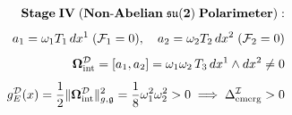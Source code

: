 \documentclass[preview]{standalone}
\begin{document}
\begin{align*}
\special{dvisvgm:raw <g id='unique000'>}\mathbf{Stage\;IV\;(Non\text{-}Abelian\;\mathfrak{su}(2)\;Polarimeter):}\\[4pt]a_1 = \omega_1 T_1\,dx^1\;(\mathcal{F}_1=0),\quad a_2 = \omega_2 T_2\,dx^2\;(\mathcal{F}_2=0)\\[4pt]\mathbf{\Omega}_{\text{int}}^{\mathcal{D}} = [a_1, a_2] = \omega_1\omega_2\,T_3\,dx^1\wedge dx^2 \neq 0\\[4pt]g_E^{\mathcal{D}}(x) = \frac{1}{2}\|\mathbf{\Omega}_{\text{int}}^{\mathcal{D}}\|_{g,\mathfrak{g}}^2 = \frac{1}{8}\omega_1^2\omega_2^2 > 0 \implies \Delta_{\text{emerg}}^{\mathcal{I}} > 0\special{dvisvgm:raw </g>}
\end{align*}
\end{document}
